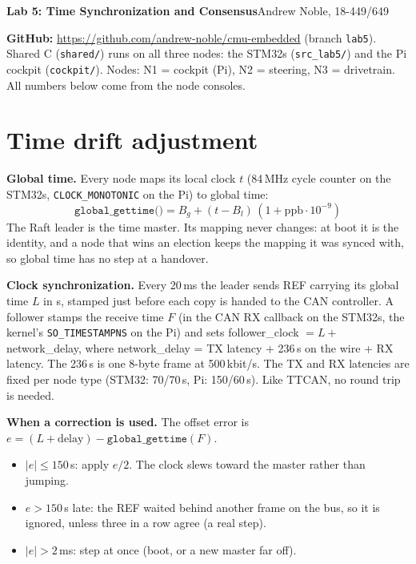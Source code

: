 \documentclass[10pt]{article}
\begin{document}
{\Large\textbf{Lab 5: Time Synchronization and Consensus}}\hfill Andrew Noble, 18-449/649

\textbf{GitHub:} \url{https://github.com/andrew-noble/cmu-embedded} (branch \texttt{lab5}).
Shared C (\texttt{shared/}) runs on all three nodes: the STM32s (\texttt{src\_lab5/}) and the Pi cockpit (\texttt{cockpit/}).
Nodes: N1 = cockpit (Pi), N2 = steering, N3 = drivetrain. All numbers below come from the node consoles.

\section{Time drift adjustment}

\textbf{Global time.} Every node maps its local clock $t$ (84\,MHz cycle counter on the STM32s, \texttt{CLOCK\_MONOTONIC} on the Pi) to global time:
\[
  \texttt{global\_gettime()} = B_g + (t - B_l)\,(1 + \text{ppb}\cdot 10^{-9})
\]
The Raft leader is the time master. Its mapping never changes: at boot it is the identity, and a node that wins an election keeps the mapping it was synced with, so global time has no step at a handover.

\textbf{Clock synchronization.} Every 20\,ms the leader sends REF carrying its global time $L$ in \textmu s, stamped just before each copy is handed to the CAN controller. A follower stamps the receive time $F$ (in the CAN RX callback on the STM32s, the kernel's \texttt{SO\_TIMESTAMPNS} on the Pi) and sets follower\_clock $= L +$ network\_delay, where network\_delay = TX latency + 236\,\textmu s on the wire + RX latency. The 236\,\textmu s is one 8-byte frame at 500\,kbit/s. The TX and RX latencies are fixed per node type (STM32: 70/70\,\textmu s, Pi: 150/60\,\textmu s). Like TTCAN, no round trip is needed.

\textbf{When a correction is used.} The offset error is $e = (L + \text{delay}) - \texttt{global\_gettime}(F)$.
\begin{itemize}
  \item $|e| \le 150$\,\textmu s: apply $e/2$. The clock slews toward the master rather than jumping.
  \item $e > 150$\,\textmu s late: the REF waited behind another frame on the bus, so it is ignored, unless three in a row agree (a real step).
  \item $|e| > 2$\,ms: step at once (boot, or a new master far off).
\end{itemize}
\end{document}
